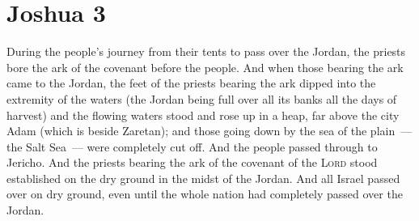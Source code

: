 \section{Joshua 3}\label{Joshua 3}
\begin{enumerate}
     During the people's journey from their tents to pass over the Jordan, the priests bore the ark of the covenant before the people.%
     And when those bearing the ark came to the Jordan, the feet of the priests bearing the ark dipped into the extremity of the waters (the Jordan being full over all its banks all the days of harvest)%
     and the flowing waters stood and rose up in a heap, far above the city Adam (which is beside Zaretan); and those going down by the sea of the plain~--- the Salt Sea~--- were completely cut off. And the people passed through to Jericho.%
     And the priests bearing the ark of the covenant of the \textsc{Lord} stood established on the dry ground in the midst of the Jordan. And all Israel passed over on dry ground, even until the whole nation had completely passed over the Jordan.%
\end{enumerate}
